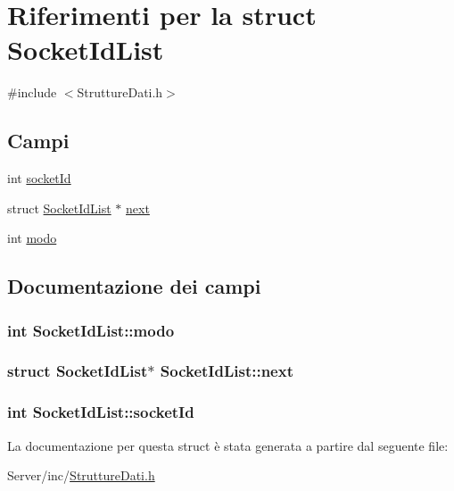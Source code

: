 \hypertarget{structSocketIdList}{\section{Riferimenti per la struct Socket\+Id\+List}
\label{structSocketIdList}
}


{\ttfamily \#include $<$Strutture\+Dati.\+h$>$}

\subsection*{Campi}
\begin{DoxyCompactItemize}
\item 
int \hyperlink{structSocketIdList_ae3472c269defc3b5c5158bb23316989d}{socket\+Id}
\item 
struct \hyperlink{structSocketIdList}{Socket\+Id\+List} $\ast$ \hyperlink{structSocketIdList_a6a4ac9d91704e30a162d520bca97a270}{next}
\item 
int \hyperlink{structSocketIdList_a84ef1b1879e61c17fe09e27e2038d0ee}{modo}
\end{DoxyCompactItemize}


\subsection{Documentazione dei campi}
\hypertarget{structSocketIdList_a84ef1b1879e61c17fe09e27e2038d0ee}{
\subsubsection[{modo}]{\setlength{\rightskip}{0pt plus 5cm}int Socket\+Id\+List\+::modo}}\label{structSocketIdList_a84ef1b1879e61c17fe09e27e2038d0ee}
\hypertarget{structSocketIdList_a6a4ac9d91704e30a162d520bca97a270}{
\subsubsection[{next}]{\setlength{\rightskip}{0pt plus 5cm}struct {\bf Socket\+Id\+List}$\ast$ Socket\+Id\+List\+::next}}\label{structSocketIdList_a6a4ac9d91704e30a162d520bca97a270}
\hypertarget{structSocketIdList_ae3472c269defc3b5c5158bb23316989d}{
\subsubsection[{socket\+Id}]{\setlength{\rightskip}{0pt plus 5cm}int Socket\+Id\+List\+::socket\+Id}}\label{structSocketIdList_ae3472c269defc3b5c5158bb23316989d}


La documentazione per questa struct è stata generata a partire dal seguente file\+:\begin{DoxyCompactItemize}
\item 
Server/inc/\hyperlink{StruttureDati_8h}{Strutture\+Dati.\+h}\end{DoxyCompactItemize}
